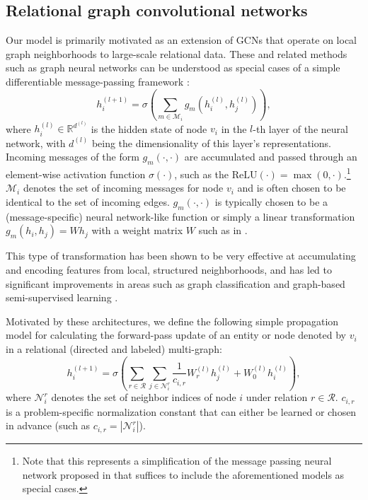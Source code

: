 \subsection{Relational graph convolutional networks}
Our model is primarily motivated as an extension of GCNs that operate on local graph neighborhoods \cite{duvenaud2015convolutional,kipf2016semi} to large-scale relational data. These and related methods such as graph neural networks \cite{scarselli2009graph} can be understood as special cases of a simple differentiable message-passing framework \cite{gilmer2017neural}:
\begin{equation}
\label{eq:message-passing}
h_i^{(l+1)}= \sigma \left( \sum_{m \in \mathcal{M}_i} g_m(h_i^{(l)}, h_j^{(l)}) \right),
\end{equation}
where $h_i^{(l)}\in\mathbb{R}^{d^{(l)}}$ is the hidden state of node $v_i$ in the $l$-th layer of the neural network, with $d^{(l)}$ being the dimensionality of this layer's representations. Incoming messages of the form $g_m(\cdot, \cdot)$ are accumulated and passed through an element-wise activation function $\sigma(\cdot)$, such as the $\mathrm{ReLU}(\cdot)=\max(0,\cdot)$.\footnote{Note that this represents a simplification of the message passing neural network proposed in \cite{gilmer2017neural} that suffices to include the aforementioned models as special cases.} $\mathcal{M}_i$ denotes the set of incoming messages for node $v_i$ and is often chosen to be identical to the set of incoming edges. $g_m(\cdot, \cdot)$ is typically chosen to be a (message-specific) neural network-like function or simply a linear transformation $g_m(h_i, h_j)=W h_j$ with a weight matrix $W$ such as in \citet{kipf2016semi}.

This type of transformation has been shown to be very effective at accumulating and encoding features from local, structured neighborhoods, and has led to significant improvements in areas such as graph classification \cite{duvenaud2015convolutional} and graph-based semi-supervised learning \cite{kipf2016semi}.

Motivated by these architectures, we define the following simple propagation model for calculating the forward-pass update of an entity or node denoted by $v_i$ in a relational (directed and labeled) multi-graph:
\begin{equation}
\label{eq:layer}
h_i^{(l+1)}= \sigma \left( \sum_{r \in \mathcal{R}}\sum_{j \in \mathcal{N}^r_i} \frac{1}{c_{i,r}}W_r^{(l)} h_j^{(l)} + W_0^{(l)}h_i^{(l)} \right),
\end{equation}
where $\mathcal{N}^r_i$ denotes the set of neighbor indices of node $i$ under relation $r\in\mathcal{R}$. $c_{i,r}$ is a problem-specific normalization constant that can either be learned or chosen in advance (such as $c_{i,r}=|\mathcal{N}^r_i|$).

